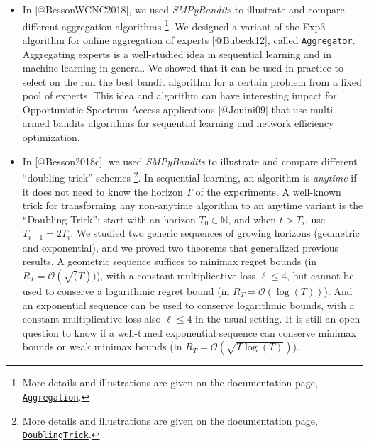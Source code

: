 \begin{itemize}
\tightlist
\item
  In {[}@BessonWCNC2018{]}, we used \emph{SMPyBandits} to illustrate and
  compare different aggregation algorithms \footnote{More details and
    illustrations are given on the documentation page,
    \href{https://smpybandits.github.io/Aggregation.html}{\texttt{Aggregation}}.}.
  We designed a variant of the Exp3 algorithm for online aggregation of
  experts {[}@Bubeck12{]}, called
  \href{https://smpybandits.github.io/docs/Policies.Aggregator.html}{\texttt{Aggregator}}.
  Aggregating experts is a well-studied idea in sequential learning and
  in machine learning in general. We showed that it can be used in
  practice to select on the run the best bandit algorithm for a certain
  problem from a fixed pool of experts. This idea and algorithm can have
  interesting impact for Opportunistic Spectrum Access applications
  {[}@Jouini09{]} that use multi-armed bandits algorithms for sequential
  learning and network efficiency optimization.
\end{itemize}

\begin{itemize}
\tightlist
\item
  In {[}@Besson2018c{]}, we used \emph{SMPyBandits} to illustrate and
  compare different ``doubling trick'' schemes \footnote{More details
    and illustrations are given on the documentation page,
    \href{https://smpybandits.github.io/DoublingTrick.html}{\texttt{DoublingTrick}}.}.
  In sequential learning, an algorithm is \emph{anytime} if it does not
  need to know the horizon \(T\) of the experiments. A well-known trick
  for transforming any non-anytime algorithm to an anytime variant is
  the ``Doubling Trick'': start with an horizon \(T_0\in\mathbb{N}\),
  and when \(t > T_i\), use \(T_{i+1} = 2 T_i\). We studied two generic
  sequences of growing horizons (geometric and exponential), and we
  proved two theorems that generalized previous results. A geometric
  sequence suffices to minimax regret bounds (in
  \(R_T = \mathcal{O}(\sqrt(T))\)), with a constant multiplicative loss
  \(\ell \leq 4\), but cannot be used to conserve a logarithmic regret
  bound (in \(R_T = \mathcal{O}(\log(T))\)). And an exponential sequence
  can be used to conserve logarithmic bounds, with a constant
  multiplicative loss also \(\ell \leq 4\) in the usual setting. It is
  still an open question to know if a well-tuned exponential sequence
  can conserve minimax bounds or weak minimax bounds (in
  \(R_T = \mathcal{O}(\sqrt{T \log(T)})\)).
\end{itemize}

